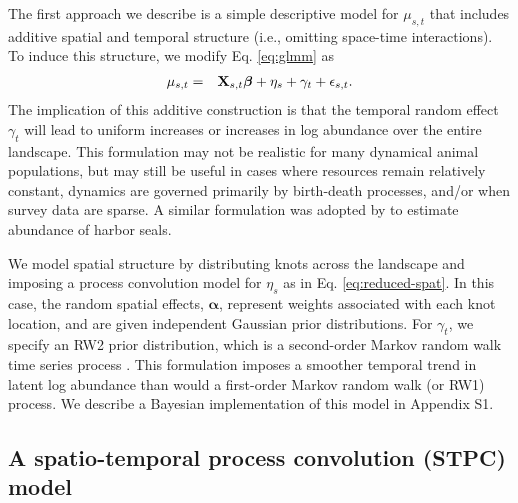 \documentclass[12pt,english]{article}
\begin{document}
\begin{spacing}{1.9}
The first approach we describe is a simple descriptive model for $\mu_{s,t}$ that includes additive spatial and
temporal structure (i.e., omitting space-time interactions).  To induce this structure, we modify Eq. \ref{eq:glmm} as
\begin{eqnarray*}
  \mu_{s,t} & = & {\bf X}_{s,t} \boldsymbol{\beta} + \eta_s + \gamma_t + \epsilon_{s,t}.
\end{eqnarray*}
The implication of this additive construction is that the temporal random effect $\gamma_t$ will lead to uniform increases or increases in log abundance over the entire landscape. This formulation may not be realistic for many dynamical animal populations, but may still be useful in cases where resources remain relatively constant, dynamics are governed primarily by birth-death processes, and/or when survey data are sparse.  A similar formulation was adopted by \citet{VerHoefJansen2007} to estimate abundance of harbor seals.

We model spatial structure by distributing knots across the landscape and imposing a process convolution model for $\eta_s$ as in Eq. \ref{eq:reduced-spat}.  In this case, the random spatial effects, $\boldsymbol{\alpha}$, represent weights associated with each knot location, and are given independent Gaussian prior distributions.
For $\gamma_t$, we specify an RW2 prior distribution, which is a second-order Markov random walk time series process \citep{RueHeld2005}.  This formulation imposes a smoother temporal trend in latent log abundance than would a first-order Markov random walk (or RW1) process.  We describe a Bayesian implementation of this model in Appendix S1.

\subsection{A spatio-temporal process convolution (STPC) model}


\end{spacing}
\end{document}
